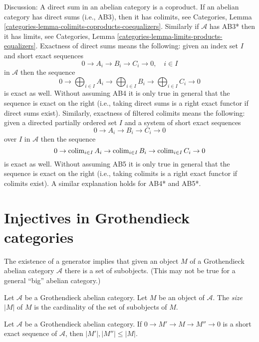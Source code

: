 \noindent
Discussion: A direct sum in an abelian category is a coproduct.
If an abelian category has direct sums (i.e., AB3), then it has colimits, see
Categories, Lemma \ref{categories-lemma-colimits-coproducts-coequalizers}. 
Similarly if $\mathcal{A}$ has AB3* then it has limits, see
Categories, Lemma \ref{categories-lemma-limits-products-equalizers}. 
Exactness of direct sums means the following: given an index set $I$
and short exact sequences
$$
0 \to A_i \to B_i \to C_i \to 0,\quad i \in I
$$
in $\mathcal{A}$ then the sequence
$$
0 \to
\bigoplus\nolimits_{i \in I} A_i \to
\bigoplus\nolimits_{i \in I} B_i \to
\bigoplus\nolimits_{i \in I} C_i \to 0
$$
is exact as well. Without assuming AB4 it is only true in general that
the sequence is exact on the right (i.e., taking direct sums is a right
exact functor if direct sums exist). Similarly, exactness of filtered
colimits means the following: given a directed partially ordered set $I$
and a system of short exact sequences
$$
0 \to A_i \to B_i \to C_i \to 0
$$
over $I$ in $\mathcal{A}$ then the sequence
$$
0 \to
\mathop{\rm colim}\nolimits_{i \in I} A_i \to
\mathop{\rm colim}\nolimits_{i \in I} B_i \to
\mathop{\rm colim}\nolimits_{i \in I} C_i \to 0
$$
is exact as well. Without assuming AB5 it is only true in general that
the sequence is exact on the right (i.e., taking colimits is a right
exact functor if colimits exist). A similar explanation holds for
AB4* and AB5*.




\section{Injectives in Grothendieck categories}
\label{section-grothendieck-categories}

\noindent
The existence of a generator implies that given an object $M$ of a
Grothendieck abelian category $\mathcal{A}$ there is a set of subobjects.
(This may not be true for a general ``big'' abelian category.)

\begin{definition}
\label{definition-size}
Let $\mathcal{A}$ be a Grothendieck abelian category.
Let $M$ be an object of $\mathcal{A}$.
The {\it size} $|M|$ of $M$ is the cardinality of the set of subobjects
of $M$.
\end{definition}

\begin{lemma}
\label{lemma-size-goes-down}
Let $\mathcal{A}$ be a Grothendieck abelian category.
If $0 \to M' \to M \to M'' \to 0$ is a short exact sequence of
$\mathcal{A}$, then $|M'|, |M''| \leq |M|$.
\end{lemma}

